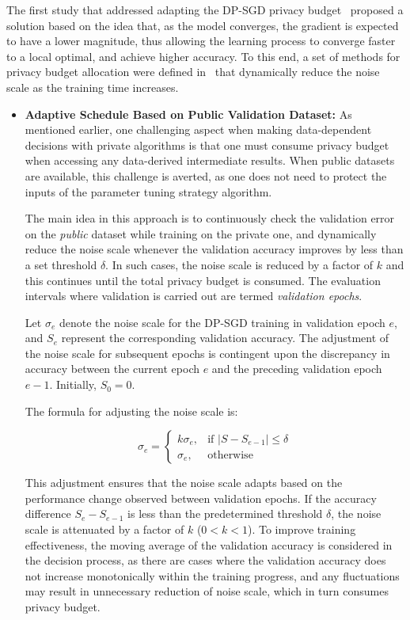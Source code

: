 The first study that addressed adapting the DP-SGD privacy budget~\cite{RefWorks:RefID:47-yu2019differentially} proposed a solution based on the idea that, as the model converges, the gradient is expected to have a lower magnitude, thus allowing the learning process to converge faster to a local optimal, and achieve higher accuracy. To this end, a set of methods for privacy budget allocation were defined in~\cite{RefWorks:RefID:47-yu2019differentially} that dynamically reduce the noise scale as the training time increases. 
\begin{itemize}
    \item \textbf{Adaptive Schedule Based on Public Validation Dataset:} 
As mentioned earlier, one challenging aspect when making data-dependent decisions with private algorithms is that one must consume privacy budget when accessing any data-derived intermediate results. When public datasets are available, this challenge is averted, as one does not need to protect the inputs of the parameter tuning strategy algorithm. 

    The main idea in this approach is to continuously check the validation error on the {\em public} dataset while training on the private one, and dynamically reduce the noise scale whenever the validation accuracy improves by less than a set threshold $\delta$. In such cases, the noise scale is reduced by a factor of $k$ and this continues until the total privacy budget is consumed.
The evaluation intervals where validation is carried out are termed {\em validation epochs}.

Let $\sigma_e$ denote the noise scale for the DP-SGD training in validation epoch $e$, and $S_e$ represent the corresponding validation accuracy. The adjustment of the noise scale for subsequent epochs is contingent upon the discrepancy in accuracy between the current epoch $e$ and the preceding validation epoch $e - 1$. Initially, $S_0 = 0$.

The formula for adjusting the noise scale is:

\[
\sigma_e = \begin{cases} 
k \sigma_e, & \text{if } |S - S_{e-1}| \leq \delta \\
\sigma_e, & \text{otherwise} 
\end{cases}
\]

This adjustment ensures that the noise scale adapts based on the performance change observed between validation epochs. If the accuracy difference $S_e-S_{e-1}$ is less than the predetermined threshold $\delta$, the noise scale is attenuated by a factor of $k$ ($0<k<1$). To improve training effectiveness, the moving average of the validation accuracy is considered in the decision process, as there are cases where the validation accuracy does not increase monotonically within the training progress, and any fluctuations may result in unnecessary reduction of noise scale, which in turn consumes privacy budget.


\end{itemize}
